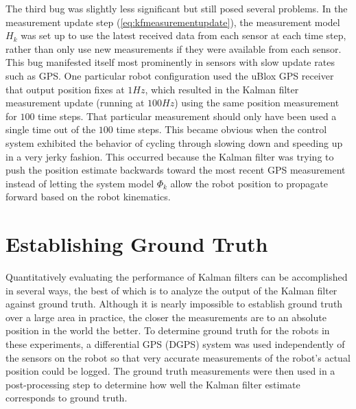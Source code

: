 The third bug was slightly less significant but still posed several problems. In the measurement update step (\ref{eq:kfmeasurementupdate}), the measurement model $H_k$ was set up to use the latest received data from each sensor at each time step, rather than only use new measurements if they were available from each sensor. This bug manifested itself most prominently in sensors with slow update rates such as GPS. One particular robot configuration used the uBlox GPS receiver that output position fixes at $1 Hz$, which resulted in the Kalman filter measurement update (running at $100 Hz$) using the same position measurement for $100$ time steps. That particular measurement should only have been used a single time out of the $100$ time steps. This became obvious when the control system exhibited the behavior of cycling through slowing down and speeding up in a very jerky fashion. This occurred because the Kalman filter was trying to push the position estimate backwards toward the most recent GPS measurement instead of letting the system model $\Phi_k$ allow the robot position to propagate forward based on the robot kinematics.

\section{Establishing Ground Truth}
\label{sec:groundtruth}
Quantitatively evaluating the performance of Kalman filters can be accomplished in several ways, the best of which is to analyze the output of the Kalman filter against ground truth. Although it is nearly impossible to establish ground truth over a large area in practice, the closer the measurements are to an absolute position in the world the better. To determine ground truth for the robots in these experiments, a differential GPS (DGPS) system was used independently of the sensors on the robot so that very accurate measurements of the robot's actual position could be logged. The ground truth measurements were then used in a post-processing step to determine how well the Kalman filter estimate corresponds to ground truth.

